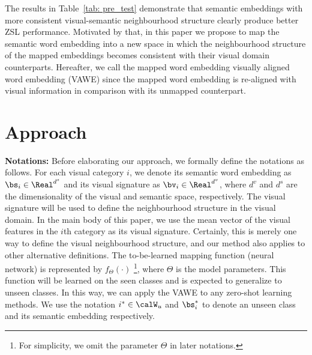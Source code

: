 \documentclass{bmvc2k}
\begin{document}
The results in Table~\ref{tab: pre_test} demonstrate that semantic embeddings with more consistent visual-semantic neighbourhood structure clearly produce better ZSL performance. Motivated by that, in this paper we propose to map the semantic word embedding into a new space in which the neighbourhood structure of the mapped embeddings becomes consistent with their visual domain counterparts. Hereafter, we call the mapped word embedding visually aligned word embedding (VAWE) since the mapped word embedding is re-aligned with visual information in comparison with its unmapped counterpart.


\section{Approach}



{\bf Notations:} Before elaborating our approach, we formally define the notations as follows. For each visual category $i$, we denote its semantic word embedding as $\bs_i \in {\Real}^{d^s}$ and its visual signature as $\bv_i \in {\Real}^{d^v}$, where $d^v$ and $d^s$ are the dimensionality of the visual and semantic space, respectively. The visual signature will be used to define the neighbourhood structure in the visual domain. In the main body of this paper, we use the mean vector of the visual features in the $i$th category as its visual signature. Certainly, this is merely one way to define the visual neighbourhood structure, and our method also applies to other alternative definitions.
The to-be-learned mapping function (neural network) is represented by $f_\Theta(\cdot)$ \footnote{For simplicity, we omit the parameter $\Theta$ in later notations.}, where $\Theta$ is the model parameters. This function will be learned on the seen classes and is expected to generalize to unseen classes. In this way, we can apply the VAWE to any zero-shot learning methods. We use the notation $i^*\in \calW_u$ and $\bs_i^*$ to denote an unseen class and its semantic embedding respectively.
\end{document}
